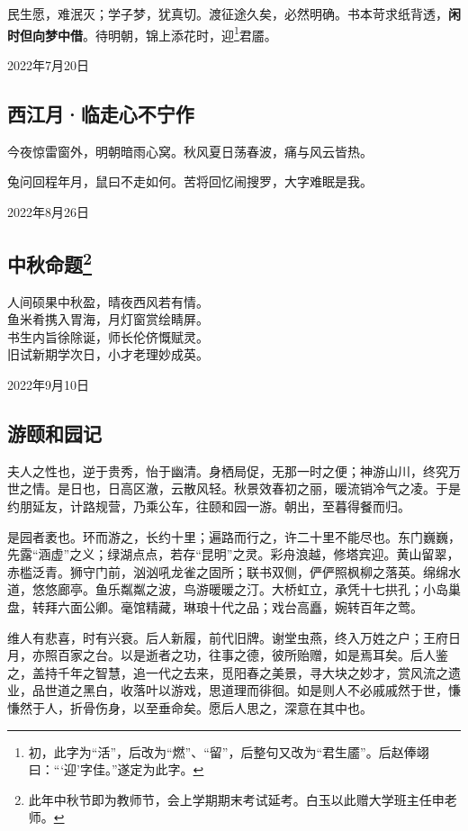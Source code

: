 \documentclass[a5paper]{ctexart}
\begin{document}
	民生愿，难泯灭；学子梦，犹真切。渡征途久矣，必然明确。书本苛求纸背透，\textbf{闲时但向梦中借}。待明朝，锦上添花时，迎\footnote{初，此字为“活”，后改为“燃”、“留”，后整句又改为“君生靥”。后赵俸翊曰：“‘迎’字佳。”遂定为此字。}君靥。
	\begin{flushright}
		2022年7月20日
	\end{flushright}
	
	\subsection{西江月·临走心不宁作}
	今夜惊雷窗外，明朝暗雨心窝。秋风夏日荡春波，痛与风云皆热。
	
	兔问回程年月，鼠曰不走如何。苦将回忆闹搜罗，大字难眠是我。
	\begin{flushright}
		2022年8月26日
	\end{flushright}
	
	
	\subsection[中秋命题]{中秋命题\footnote{此年中秋节即为教师节，会上学期期末考试延考。白玉以此赠大学班主任申老师。}}
	\begin{center}
		人间硕果中秋盈，晴夜西风若有情。\\
		鱼米肴携入胃海，月灯窗赏绘睛屏。\\
		书生内旨徐除诞，师长伦侪慨赋灵。\\
		旧试新期学次日，小才老理妙成英。
	\end{center}
	\hfill 2022年9月10日
	
	\subsection{游颐和园记}
	夫人之性也，逆于贵秀，怡于幽清。身栖局促，无那一时之便；神游山川，终究万世之情。是日也，日高区澈，云散风轻。秋景效春初之丽，暖流销冷气之凌。于是约朋延友，计路规营，乃乘公车，往颐和园一游。朝出，至暮得餐而归。
	
	是园者袤也。环而游之，长约十里；遍路而行之，许二十里不能尽也。东门巍巍，先露“涵虚”之义；绿湖点点，若存“昆明”之灵。彩舟浪越，修塔宾迎。黄山留翠，赤槛泛青。狮守门前，汹汹吼龙雀之固所；联书双侧，俨俨照枫柳之落英。绵绵水道，悠悠廊亭。鱼乐粼粼之波，鸟游暖暖之汀。大桥虹立，承凭十七拱孔；小岛巢盘，转拜六面公卿。毫馆精藏，琳琅十代之品；戏台高矗，婉转百年之莺。
	
	维人有悲喜，时有兴衰。后人新履，前代旧牌。谢堂虫燕，终入万姓之户；王府日月，亦照百家之台。以是逝者之功，往事之德，彼所贻赠，如是焉耳矣。后人鉴之，盖持千年之智慧，追一代之去来，觅阳春之美景，寻大块之妙才，赏风流之遗业，品世道之黑白，收落叶以游戏，思道理而徘徊。如是则人不必戚戚然于世，慊慊然于人，折骨伤身，以至垂命矣。愿后人思之，深意在其中也。
	
\end{document}
